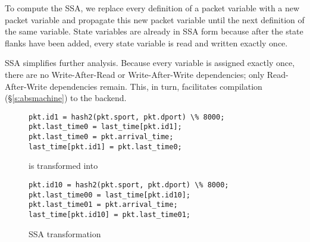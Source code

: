 To compute the SSA, we replace every definition of a packet variable with a new
packet variable and propagate this new packet variable until the next
definition of the same variable. State variables are already in SSA form
because after the state flanks have been added, every state variable is read
and written exactly once.

SSA simplifies further analysis. Because every variable is assigned exactly
once, there are no Write-After-Read or Write-After-Write dependencies; only
Read-After-Write dependencies remain. This, in turn, facilitates compilation
(\S\ref{s:absmachine}) to the backend.
\begin{figure}
\begin{tiny}
\begin{lstlisting}
pkt.id1 = hash2(pkt.sport, pkt.dport) \% 8000;
pkt.last_time0 = last_time[pkt.id1];
pkt.last_time0 = pkt.arrival_time;
last_time[pkt.id1] = pkt.last_time0;
\end{lstlisting}
\end{tiny}
\begin{center}
is transformed into
\end{center}
\begin{tiny}
\begin{lstlisting}
pkt.id10 = hash2(pkt.sport, pkt.dport) \% 8000;
pkt.last_time00 = last_time[pkt.id10];
pkt.last_time01 = pkt.arrival_time;
last_time[pkt.id10] = pkt.last_time01;
\end{lstlisting}
\end{tiny}
\caption{SSA transformation}
\label{fig:stateful_flanks}
\end{figure}

